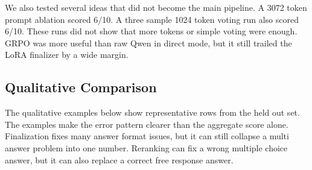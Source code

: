 \documentclass[11pt]{article}
\begin{document}
We also tested several ideas that did not become the main pipeline. A 3072 token prompt ablation scored 6/10. A three sample 1024 token voting run also scored 6/10. These runs did not show that more tokens or simple voting were enough. GRPO was more useful than raw Qwen in direct mode, but it still trailed the LoRA finalizer by a wide margin.

\begin{table}[H]
\caption{Ablations and negative results. GRPO direct improved over raw Qwen on some rows, but it did not beat supervised finalization.}
\centering
{}
\end{table}

\subsection{Qualitative Comparison}
\label{sec:qualitative}

The qualitative examples below show representative rows from the held out set. The examples make the error pattern clearer than the aggregate score alone. Finalization fixes many answer format issues, but it can still collapse a multi answer problem into one number. Reranking can fix a wrong multiple choice answer, but it can also replace a correct free response answer.
\end{document}
